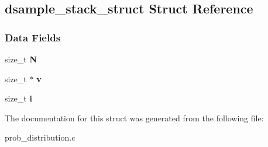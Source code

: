 \hypertarget{structdsample__stack__struct}{}\subsection{dsample\+\_\+stack\+\_\+struct Struct Reference}
\label{structdsample__stack__struct}
\subsubsection*{Data Fields}
\begin{DoxyCompactItemize}
\item 
\mbox{\label{structdsample__stack__struct_ab39b2c4bdb726238d56505b9c36ae5b0}} 
size\+\_\+t {\bfseries N}
\item 
\mbox{\label{structdsample__stack__struct_a2d4488738de9d965e921a1b111977678}} 
size\+\_\+t $\ast$ {\bfseries v}
\item 
\mbox{\label{structdsample__stack__struct_a10a913c13873bea873aca24dabef2793}} 
size\+\_\+t {\bfseries i}
\end{DoxyCompactItemize}


The documentation for this struct was generated from the following file\+:\begin{DoxyCompactItemize}
\item 
prob\+\_\+distribution.\+c\end{DoxyCompactItemize}
